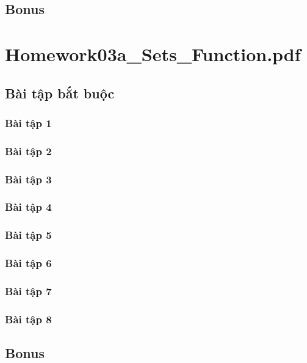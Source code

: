 \documentclass[a4paper]{article}
\begin{document}
\clearpage
\subsection{Bonus}
\clearpage

\section{Homework03a\_Sets\_Function.pdf}
\subsection{Bài tập bắt buộc}
\subsubsection{Bài tập 1}

\clearpage
\subsubsection{Bài tập 2}

\clearpage
\subsubsection{Bài tập 3}

\clearpage
\subsubsection{Bài tập 4}

\clearpage
\subsubsection{Bài tập 5}

\clearpage
\subsubsection{Bài tập 6}

\clearpage
\subsubsection{Bài tập 7}

\clearpage
\subsubsection{Bài tập 8}

\clearpage
\subsection{Bonus}
\clearpage
\end{document}

